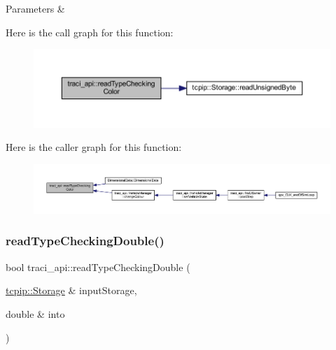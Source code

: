 \begin{DoxyParams}{Parameters}
{\em } & \\
\hline
\end{DoxyParams}
Here is the call graph for this function\+:
\nopagebreak
\begin{figure}[H]
\begin{center}
\leavevmode
\includegraphics[width=350pt]{namespacetraci__api_af8c7656fbd212acb13f037d4fb20f1f7_cgraph}
\end{center}
\end{figure}
Here is the caller graph for this function\+:
\nopagebreak
\begin{figure}[H]
\begin{center}
\leavevmode
\includegraphics[width=350pt]{namespacetraci__api_af8c7656fbd212acb13f037d4fb20f1f7_icgraph}
\end{center}
\end{figure}
\mbox{\label{namespacetraci__api_a5229be0b43fc9f5d9f413d5e51924b50}} 
\subsubsection{\texorpdfstring{read\+Type\+Checking\+Double()}{readTypeCheckingDouble()}}
{\footnotesize\ttfamily bool traci\+\_\+api\+::read\+Type\+Checking\+Double (\begin{DoxyParamCaption}\item[{\hyperlink{classtcpip_1_1_storage}{tcpip\+::\+Storage} \&}]{input\+Storage,  }\item[{double \&}]{into }\end{DoxyParamCaption})}



